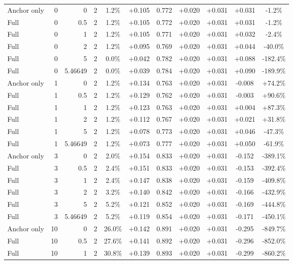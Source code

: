 \begin{table}[htbp]
\begin{tabular}{lrrrccccccc}
Anchor only & 0 & 0 & 2 & 1.2\% & +0.105 & 0.772 & +0.020 & +0.031 & +0.031 & -1.2\% \\
Full & 0 & 0.5 & 2 & 1.2\% & +0.105 & 0.772 & +0.020 & +0.031 & +0.031 & -1.2\% \\
Full & 0 & 1 & 2 & 1.2\% & +0.105 & 0.771 & +0.020 & +0.031 & +0.032 & -2.4\% \\
Full & 0 & 2 & 2 & 1.2\% & +0.095 & 0.769 & +0.020 & +0.031 & +0.044 & -40.0\% \\
Full & 0 & 5 & 2 & 0.0\% & +0.042 & 0.782 & +0.020 & +0.031 & +0.088 & -182.4\% \\
Full & 0 & 5.46649 & 2 & 0.0\% & +0.039 & 0.784 & +0.020 & +0.031 & +0.090 & -189.9\% \\
Anchor only & 1 & 0 & 2 & 1.2\% & +0.134 & 0.763 & +0.020 & +0.031 & -0.008 & +74.2\% \\
Full & 1 & 0.5 & 2 & 1.2\% & +0.129 & 0.762 & +0.020 & +0.031 & -0.003 & +90.6\% \\
Full & 1 & 1 & 2 & 1.2\% & +0.123 & 0.763 & +0.020 & +0.031 & +0.004 & +87.3\% \\
Full & 1 & 2 & 2 & 1.2\% & +0.112 & 0.767 & +0.020 & +0.031 & +0.021 & +31.8\% \\
Full & 1 & 5 & 2 & 1.2\% & +0.078 & 0.773 & +0.020 & +0.031 & +0.046 & -47.3\% \\
Full & 1 & 5.46649 & 2 & 1.2\% & +0.073 & 0.777 & +0.020 & +0.031 & +0.050 & -61.9\% \\
Anchor only & 3 & 0 & 2 & 2.0\% & +0.154 & 0.833 & +0.020 & +0.031 & -0.152 & -389.1\% \\
Full & 3 & 0.5 & 2 & 2.4\% & +0.151 & 0.833 & +0.020 & +0.031 & -0.153 & -392.4\% \\
Full & 3 & 1 & 2 & 2.4\% & +0.147 & 0.838 & +0.020 & +0.031 & -0.159 & -409.8\% \\
Full & 3 & 2 & 2 & 3.2\% & +0.140 & 0.842 & +0.020 & +0.031 & -0.166 & -432.9\% \\
Full & 3 & 5 & 2 & 5.2\% & +0.121 & 0.852 & +0.020 & +0.031 & -0.169 & -444.8\% \\
Full & 3 & 5.46649 & 2 & 5.2\% & +0.119 & 0.854 & +0.020 & +0.031 & -0.171 & -450.1\% \\
Anchor only & 10 & 0 & 2 & 26.0\% & +0.142 & 0.891 & +0.020 & +0.031 & -0.295 & -849.7\% \\
Full & 10 & 0.5 & 2 & 27.6\% & +0.141 & 0.892 & +0.020 & +0.031 & -0.296 & -852.0\% \\
Full & 10 & 1 & 2 & 30.8\% & +0.139 & 0.893 & +0.020 & +0.031 & -0.299 & -860.2\% \\

\end{tabular}
\end{table}
